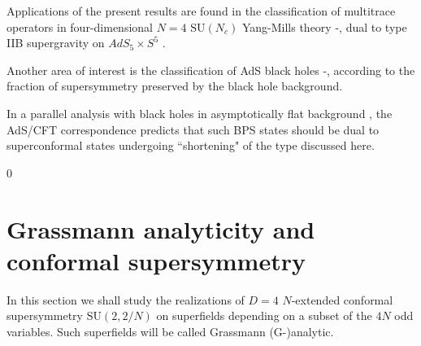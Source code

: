 \documentclass[a4paper,12pt]{article}
\begin{document}
Applications of the present results are found \cite{FZa,AFSZ} in 
the classification of multitrace operators in four-dimensional 
$N=4$ $\mbox{SU}(N_c)$ Yang-Mills theory \cite{cs}-\cite{sk}, dual 
to type IIB supergravity on $AdS_5\times S^5$ \cite{mal}.

Another area of interest is the classification of AdS black holes 
\cite{hawk}-\cite{duffl}, according to the fraction of 
supersymmetry preserved by the black hole background.

In a parallel analysis with black holes in asymptotically flat 
background \cite{FMG}, the AdS/CFT correspondence predicts that 
such BPS states should be dual to superconformal states undergoing 
``shortening" of the type discussed here.  

\setcounter{equation}0 
\section{Grassmann analyticity and conformal supersymmetry}\label{GACS}

In this section we shall study the realizations of $D=4$ 
$N$-extended conformal supersymmetry $\mbox{SU}(2,2/N)$ on 
superfields depending on a subset of the $4N$ odd variables. Such 
superfields will be called Grassmann (G-)analytic.
\end{document}
